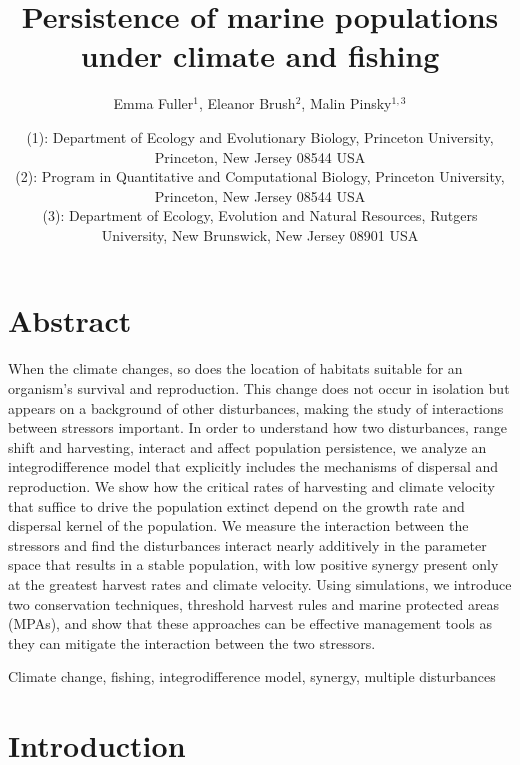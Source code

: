 \documentclass[12pt,english]{article}
\title{Persistence of marine populations under climate and fishing}
\author{Emma Fuller$^1$, Eleanor Brush$^2$, Malin Pinsky$^{1,3}$}
\date{\small (1): Department of Ecology and Evolutionary Biology, Princeton University, Princeton, New Jersey 08544 USA \\
(2): Program in Quantitative and Computational Biology, Princeton University, Princeton, New Jersey 08544 USA \\
(3): Department of Ecology, Evolution and Natural Resources, Rutgers University, New Brunswick, New Jersey 08901 USA}
\begin{document}
\maketitle
\pagebreak
\begin{spacing}{1.9}
\begin{flushleft}

\section{Abstract}

When the climate changes, so does the location of habitats suitable for an organism's survival and reproduction. This change does not occur in isolation but appears on a background of other disturbances, making the study of interactions between stressors important. In order to understand how two disturbances, range shift and harvesting, interact and affect population persistence, we analyze an integrodifference model that explicitly includes the mechanisms of dispersal and reproduction. We show how the critical rates of harvesting and climate velocity that suffice to drive the population extinct depend on the growth rate and dispersal kernel of the population.  We measure the interaction between the stressors and find the disturbances interact nearly additively in the parameter space that results in a stable population, with low positive synergy present only at the greatest harvest rates and climate velocity.  Using simulations, we introduce two conservation techniques, threshold harvest rules and marine protected areas (MPAs), and show that these approaches can be effective management tools as they can mitigate the interaction between the two stressors.  

\hspace{10cm}

 Climate change, fishing, integrodifference model, synergy, multiple disturbances

\section{Introduction}


\end{flushleft}
\end{spacing}
\end{document}
